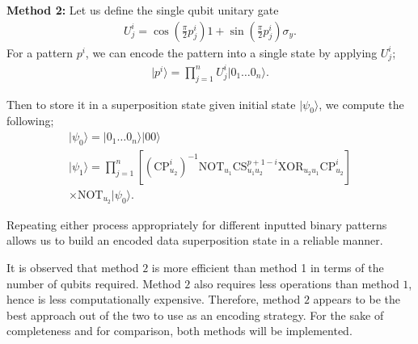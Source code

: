 \begin{minipage}[b]{0.45\textwidth}
\textbf{Method 2:}
Let us define the single qubit unitary gate
\begin{align*}{}
U_j^i = \cos\left(\frac{\pi}{2} p_j^i\right)1 + \sin \left(\frac{\pi}{2} p_j^i\right)\sigma_y.
\end{align*}
For a pattern $p^i$, we can encode the pattern into a single state by applying $U_j^i$;
\begin{align*}
    \vert p^i \rangle = \prod\limits_{j=1}^n U_j^i \vert 0_1\dots 0_n\rangle.
\end{align*}

Then to store it in a superposition state given initial state $\vert\psi_0\rangle$, we compute the following;
\begin{multline*}
    \vert\psi_0 \rangle = \vert 0_1\dots0_n\rangle\vert00\rangle\\
    \vert\psi_1 \rangle = \prod\limits_{j=1}^{n} \left[\left( \textrm{CP}_{u_2}^{i}\right)^{-1} \textrm{NOT}_{u_1} \textrm{CS}_{u_1u_2}^{p+1-i} \textrm{XOR}_{u_{2}u_{1}} \textrm{CP}_{u_{2}}^{i}\right] \\ \times \textrm{NOT}_{u_2} \vert\psi_0\rangle.   
\end{multline*}
\end{minipage}

Repeating either process appropriately for different inputted binary patterns allows us to build an encoded data superposition state in a reliable manner.

It is observed that method $2$ is more efficient than method 1 in terms of the number of qubits required. Method $2$ also requires less operations than method $1$, hence is less computationally expensive. Therefore, method $2$ appears to be the best approach out of the two to use as an encoding strategy. For the sake of completeness and for comparison, both methods will be implemented.

